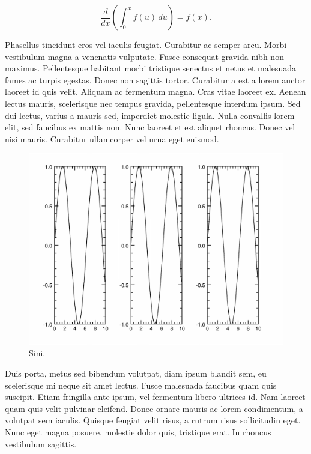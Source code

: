 \documentclass[12pt,a4paper,twoside]{article}
\begin{document}
\begin{equation}
        \frac{d}{dx}\left( \int_{0}^{x} f(u)\,du\right)=f(x).
\end{equation}

Phasellus tincidunt eros vel iaculis feugiat. Curabitur ac semper arcu. Morbi vestibulum magna a venenatis vulputate. Fusce consequat gravida nibh non maximus. Pellentesque habitant morbi tristique senectus et netus et malesuada fames ac turpis egestas. Donec non sagittis tortor. Curabitur a est a lorem auctor laoreet id quis velit. Aliquam ac fermentum magna. Cras vitae laoreet ex. Aenean lectus mauris, scelerisque nec tempus gravida, pellentesque interdum ipsum. Sed dui lectus, varius a mauris sed, imperdiet molestie ligula. Nulla convallis lorem elit, sed faucibus ex mattis non. Nunc laoreet et est aliquet rhoncus. Donec vel nisi mauris. Curabitur ullamcorper vel urna eget euismod.
\begin{figure}[!t]
	\centering
		\includegraphics[width=\textwidth]{sini.pdf}
		\caption{Sini.}
\end{figure}
Duis porta, metus sed bibendum volutpat, diam ipsum blandit sem, eu scelerisque mi neque sit amet lectus. Fusce malesuada faucibus quam quis suscipit. Etiam fringilla ante ipsum, vel fermentum libero ultrices id. Nam laoreet quam quis velit pulvinar eleifend. Donec ornare mauris ac lorem condimentum, a volutpat sem iaculis. Quisque feugiat velit risus, a rutrum risus sollicitudin eget. Nunc eget magna posuere, molestie dolor quis, tristique erat. In rhoncus vestibulum sagittis. 
\end{document}
